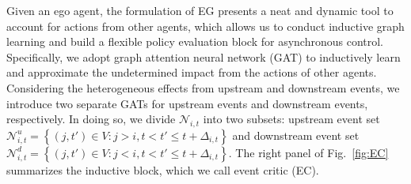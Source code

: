 \documentclass{article}
\begin{document}
Given an ego agent, the formulation of EG presents a neat and dynamic tool to account for actions from other agents, which allows us to conduct inductive graph learning and build a flexible policy evaluation block for asynchronous control. Specifically, we adopt graph attention neural network (GAT) \cite{velivckovic2017graph} to inductively learn and approximate the undetermined impact from the actions of other agents. Considering the heterogeneous effects from upstream and downstream events, we introduce two separate GATs for upstream events and downstream events, respectively. In doing so, we divide $\mathcal{N}_{i,t}$ into two subsets: upstream event set $\mathcal{N}^u_{i,t}=\left\{\left(j,t'\right) \in {V} : j>i, t<t'\le t+\Delta_{i,t} \right\}$  and downstream event set $\mathcal{N}^d_{i,t}=\left\{\left(j,t'\right) \in {V} : j< i, t<t'\le t+\Delta_{i,t} \right\}$. The right panel of Fig.~\ref{fig:EC} summarizes the inductive block, which we call event critic (EC).

\end{document}

